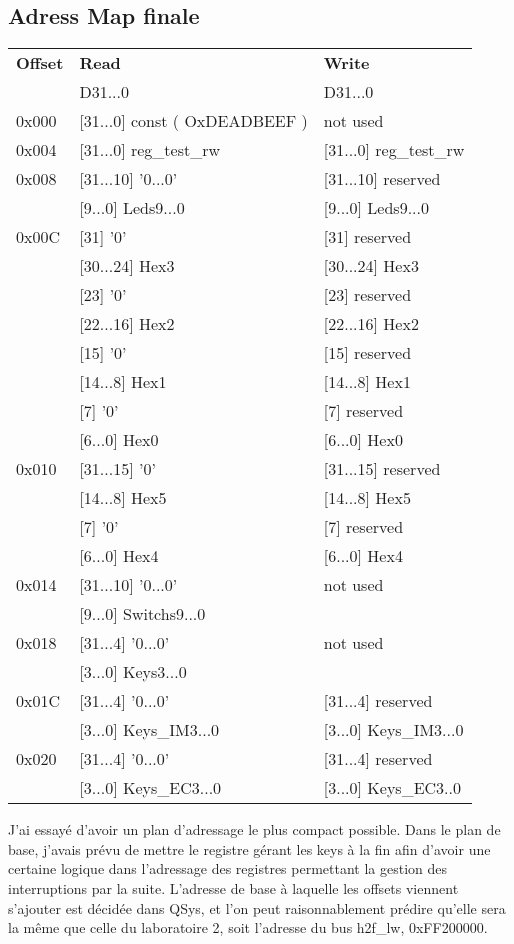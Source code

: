 \subsection{Adress Map finale}
\begin{center}
	\begin{tabular}{|l|l|l|}
		\hline
		\textbf{Offset} & \textbf{Read}  & \textbf{Write} \\
		& D31...0 & D31...0 \\
		\hline
		\hline 
		0x000 & [31...0] const ( OxDEADBEEF ) & not used  \\
		\hline
		0x004 & [31...0] reg\_test\_rw & [31...0] reg\_test\_rw  \\
		\hline
		0x008 & [31...10] '0...0' & [31...10] reserved  \\
		& [9...0] Leds9...0 & [9...0] Leds9...0  \\
		\hline
		0x00C & [31] '0' & [31] reserved  \\
		& [30...24] Hex3   &  [30...24] Hex3 \\
		& [23] '0' & [23] reserved \\
		& [22...16] Hex2   &  [22...16] Hex2 \\
		& [15] '0' & [15] reserved \\
		& [14...8] Hex1   &  [14...8] Hex1 \\
		& [7] '0' & [7] reserved \\
		& [6...0] Hex0   &  [6...0] Hex0 \\
		\hline
		0x010 & [31...15] '0' & [31...15] reserved \\
		& [14...8] Hex5   &  [14...8] Hex5 \\
		& [7] '0' & [7] reserved \\
		& [6...0] Hex4   &  [6...0] Hex4 \\
		\hline 
		0x014 & [31...10] '0...0' & not used  \\
		& [9...0] Switchs9...0 &   \\
		\hline 
		0x018 & [31...4] '0...0' & not used  \\
		& [3...0] Keys3...0 &   \\
		\hline 
		0x01C & [31...4] '0...0' & [31...4] reserved \\
		& [3...0] Keys\_IM3...0 &   [3...0] Keys\_IM3...0 \\
		\hline 
		0x020 & [31...4] '0...0' & [31...4] reserved  \\
		& [3...0] Keys\_EC3...0 &   [3...0] Keys\_EC3..0\\
		\hline
	\end{tabular}
\end{center}

\par
J'ai essayé d'avoir un plan d'adressage le plus compact possible. Dans le plan de base, j'avais prévu de mettre le registre gérant les keys à la fin afin d'avoir une certaine logique dans l'adressage des registres permettant la gestion des interruptions par la suite. L'adresse de base à laquelle les offsets viennent s'ajouter est décidée dans QSys, et l'on peut raisonnablement prédire qu'elle sera la même que celle du laboratoire 2, soit l'adresse du bus h2f\_lw, 0xFF200000.
